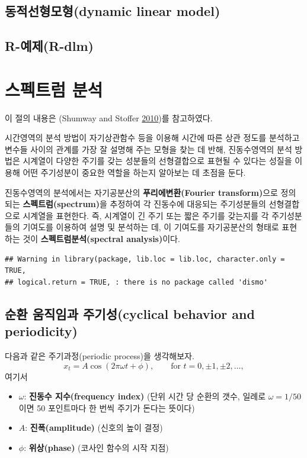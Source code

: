 \documentclass[b5paper,]{book}
\theoremstyle{definition}
\theoremstyle{definition}
\theoremstyle{definition}
\theoremstyle{remark}
\begin{document}
\section{동적선형모형(dynamic linear model)}\label{dynamic-linear-model}

\section{R-예제(R-dlm)}\label{r-r-dlm}

\chapter{스펙트럼 분석}\label{spectral}

이 절의 내용은 (Shumway and Stoffer
\protect\hyperlink{ref-Shumway2010}{2010})를 참고하였다.

시간영역의 분석 방법이 자기상관함수 등을 이용해 시간에 따른 상관 정도를
분석하고 변수들 사이의 관계를 가장 잘 설명해 주는 모형을 찾는 데 반해,
진동수영역의 분석 방법은 시계열이 다양한 주기를 갖는 성분들의
선형결합으로 표현될 수 있다는 성질을 이용해 어떤 주기성분이 중요한
역할을 하는지 알아보는 데 초점을 둔다.

진동수영역의 분석에서는 자기공분산의 \textbf{푸리에변환(Fourier
transform)}으로 정의되는 \textbf{스펙트럼(spectrum)}을 추정하여 각
진동수에 대응되는 주기성분들의 선형결합으로 시계열을 표현한다. 즉,
시계열이 긴 주기 또는 짧은 주기를 갖는지를 각 주기성분들의 기여도를
이용하여 설명 및 분석하는 데, 이 기여도를 자기공분산의 형태로 표현하는
것이 \textbf{스펙트럼분석(spectral analysis)}이다.

\begin{verbatim}
## Warning in library(package, lib.loc = lib.loc, character.only = TRUE,
## logical.return = TRUE, : there is no package called 'dismo'
\end{verbatim}

\section{순환 움직임과 주기성(cyclical behavior and
periodicity)}\label{--cyclical-behavior-and-periodicity}

다음과 같은 주기과정(periodic process)을 생각해보자.
\[x_{t}=A\cos(2\pi\omega t + \phi), \qquad{\text{for } t=0,\pm 1, \pm 2, \ldots,}\]
여기서

\begin{itemize}
\item
  \(\omega\): \textbf{진동수 지수(frequency index)} (단위 시간 당 순환의
  갯수, 일례로 \(\omega=1/50\)이면 50 포인트마다 한 번씩 주기가 돈다는
  뜻이다)
\item
  \(A\): \textbf{진폭(amplitude)} (신호의 높이 결정)
\item
  \(\phi\): \textbf{위상(phase)} (코사인 함수의 시작 지점)
\end{itemize}
\end{document}
